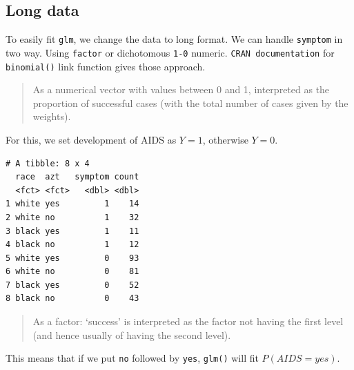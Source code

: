 \documentclass[]{book}
\newenvironment{Shaded}{\begin{snugshade}}{\end{snugshade}}
\newcommand{\CommentTok}[1]{\textcolor[rgb]{0.56,0.35,0.01}{\textit{#1}}}
\newcommand{\DataTypeTok}[1]{\textcolor[rgb]{0.13,0.29,0.53}{#1}}
\newcommand{\DecValTok}[1]{\textcolor[rgb]{0.00,0.00,0.81}{#1}}
\newcommand{\KeywordTok}[1]{\textcolor[rgb]{0.13,0.29,0.53}{\textbf{#1}}}
\newcommand{\NormalTok}[1]{#1}
\newcommand{\OperatorTok}[1]{\textcolor[rgb]{0.81,0.36,0.00}{\textbf{#1}}}
\newcommand{\StringTok}[1]{\textcolor[rgb]{0.31,0.60,0.02}{#1}}
\begin{document}
\hypertarget{long-data}{%
\subsection{Long data}\label{long-data}}

To easily fit \texttt{glm}, we change the data to long format. We can handle \texttt{symptom} in two way. Using \texttt{factor} or dichotomous \texttt{1-0} numeric. \texttt{CRAN\ documentation} for \texttt{binomial()} link function gives those approach.

\begin{quote}
As a numerical vector with values between 0 and 1, interpreted as the proportion of successful cases (with the total number of cases given by the weights).
\end{quote}

For this, we set development of AIDS as \(Y = 1\), otherwise \(Y = 0\).

\begin{Shaded}
\end{Shaded}

\begin{verbatim}
# A tibble: 8 x 4
  race  azt   symptom count
  <fct> <fct>   <dbl> <dbl>
1 white yes         1    14
2 white no          1    32
3 black yes         1    11
4 black no          1    12
5 white yes         0    93
6 white no          0    81
7 black yes         0    52
8 black no          0    43
\end{verbatim}

\begin{quote}
As a factor: `success' is interpreted as the factor not having the first level (and hence usually of having the second level).
\end{quote}

This means that if we put \texttt{no} followed by \texttt{yes}, \texttt{glm()} will fit \(P(AIDS = yes)\).
\end{document}
